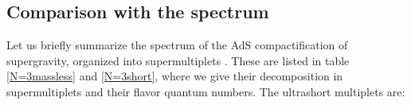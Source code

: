 \documentclass[a4paper,12pt]{article}
\def\n010{N^{0,1,0}}
\begin{document}
\subsection{Comparison with the \coordHE{} spectrum}
Let us briefly summarize the \coordHE{} spectrum of the
AdS\myHighlight{$_4\times \n010$}\coordHE{} compactification of \coordHE{} supergravity, organized
into \coordHE{} supermultiplets \cite{n010massspectrum,osp34}.
These are listed in table \ref{N=3massless} and \ref{N=3short},
where we give their decomposition in \coordHE{}
supermultiplets and their flavor quantum numbers.
The ultrashort multiplets are:
\end{document}
